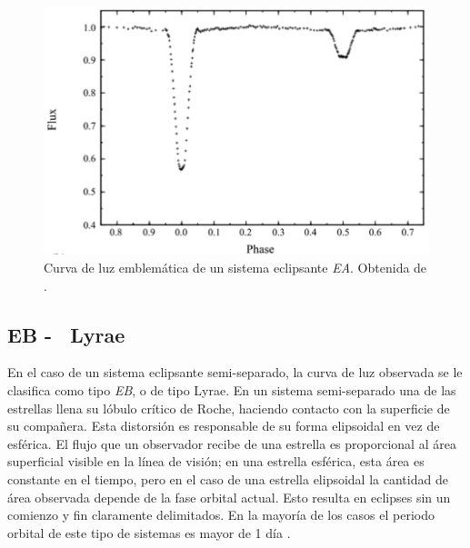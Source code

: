 \begin{figure}[!ht]
	\centering
	\includegraphics[scale=0.6]{Introduccion/Figures/Figura EA Curva_Modelling of WUMa Stars.png}
	\caption{Curva de luz emblemática de un sistema eclipsante
	\textit{EA}. Obtenida de
	\autocite{skelton_modelling_wuma_variable_stars_2009}.}
	\label{figuraEACurvaLuz}
\end{figure}

\subsection{EB - \textbeta \ Lyrae}

En el caso de un sistema eclipsante semi-separado, la curva de luz observada se
le clasifica como tipo \textit{EB}, o de tipo \textbeta \space Lyrae. En un sistema
semi-separado una de las estrellas llena su lóbulo crítico de Roche, haciendo
contacto con la superficie de su compañera. Esta distorsión es responsable de su
forma elipsoidal en vez de esférica. El flujo que un observador recibe de una
estrella es proporcional al área superficial visible en la línea de visión; en
una estrella esférica, esta área es constante en el tiempo, pero en el caso de
una estrella elipsoidal la cantidad de área observada depende de la fase orbital
actual. Esto resulta en eclipses sin un comienzo y fin claramente delimitados.
En la mayoría de los casos el periodo orbital de este tipo de sistemas es mayor
de 1 día \autocite{samus_gcvs_variable_types_2016}. 

